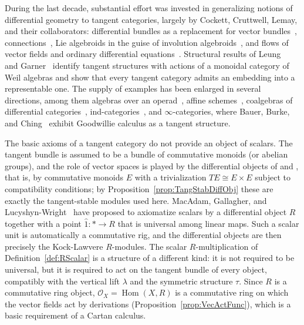 \documentclass[12pt,reqno, a4paper]{amsart}
\numberwithin{equation}{section}
\theoremstyle{plain}
\theoremstyle{definition}
\theoremstyle{remark}
\DeclareMathOperator{\Hom}{Hom}
\newcommand{\calO}{\mathcal{O}}
\newcommand{\Runit}{\hat{1}}
\begin{document}
During the last decade, substantial effort was invested in generalizing notions of differential geometry to tangent categories, largely by Cockett, Cruttwell, Lemay, and their collaborators: differential bundles as a replacement for vector bundles~\cite{CockettCruttwell:2018, MacAdam:2021, Ching:2024, CruttwellLemay:2023}, connections~\cite{CockettCruttwellConnections:2017}, Lie algebroids in the guise of involution algebroids~\cite{BurkeMacAdam:2019}, and flows of vector fields and ordinary differential equations~\cite{CockettCruttwellLemay:2021}. Structural results of Leung~\cite{Leung:2017} and Garner~\cite{Garner:2018} identify tangent structures with actions of a monoidal category of Weil algebras and show that every tangent category admits an embedding into a representable one. The supply of examples has been enlarged in several directions, among them algebras over an operad~\cite{Lanfranchi:2023b, IkonicoffLanfranchiLemay:2023}, affine schemes~\cite{LanfranchiLemay:2025}, coalgebras of differential categories~\cite{CockettLemayLucyshynWright:2020}, ind-categories~\cite{Vooys:2023}, and $\infty$-categories, where Bauer, Burke, and Ching~\cite{BauerBurkeChing:2021} exhibit Goodwillie calculus as a tangent structure.

The basic axioms of a tangent category do not provide an object of scalars. The tangent bundle is assumed to be a bundle of commutative monoids (or abelian groups), and the role of vector spaces is played by the differential objects of \cite[Def.~4.8]{CockettCruttwell:2014} and \cite[Def.~3.1]{CockettCruttwell:2018}, that is, by commutative monoids $E$ with a trivialization $TE \cong E \times E$ subject to compatibility conditions; by Proposition~\ref{prop:TangStabDiffObj} these are exactly the tangent-stable modules used here. MacAdam, Gallagher, and Lucyshyn-Wright~\cite{MacAdamGallagherLucyshynWright:2019} have proposed to axiomatize scalars by a differential object $R$ together with a point $\Runit: * \to R$ that is universal among linear maps. Such a scalar unit is automatically a commutative rig, and the differential objects are then precisely the Kock-Lawvere $R$-modules. The scalar $R$-multiplication of Definition~\ref{def:RScalar} is a structure of a different kind: it is not required to be universal, but it is required to act on the tangent bundle of every object, compatibly with the vertical lift $\lambda$ and the symmetric structure $\tau$. Since $R$ is a commutative ring object, $\calO_X = \Hom(X,R)$ is a commutative ring on which the vector fields act by derivations (Proposition~\ref{prop:VecActFunc}), which is a basic requirement of a Cartan calculus.
\end{document}
